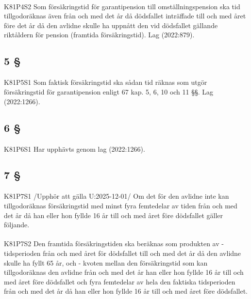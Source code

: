 \documentclass[a4paper,notitlepage,openany,10pt]{book}
\begin{document}
\paragraph*{}
{\tiny K81P4S2}
Som försäkringstid för garantipension till omställningspension ska tid tillgodoräknas även från och med det år då dödsfallet inträffade till och med året före det år då den avlidne skulle ha uppnått den vid dödsfallet gällande riktåldern för pension (framtida försäkringstid).
Lag (2022:879).
\subsection*{5 §}
\paragraph*{}
{\tiny K81P5S1}
Som faktisk försäkringstid ska sådan tid räknas som utgör försäkringstid för garantipension enligt 67 kap. 5, 6, 10 och 11 §§.
Lag (2022:1266).
\subsection*{6 §}
\paragraph*{}
{\tiny K81P6S1}
Har upphävts genom
lag (2022:1266).
\subsection*{7 §}
\paragraph*{}
{\tiny K81P7S1}
/Upphör att gälla U:2025-12-01/
Om det för den avlidne inte kan tillgodoräknas försäkringstid med minst fyra femtedelar av tiden från och med det år då han eller hon fyllde 16 år till och med året före dödsfallet gäller följande.
\paragraph*{}
{\tiny K81P7S2}
Den framtida försäkringstiden ska beräknas som produkten av
\newline - tidsperioden från och med året för dödsfallet till och med det år då den avlidne skulle ha fyllt 65 år, och
\newline - kvoten mellan den försäkringstid som kan tillgodoräknas den avlidne från och med det år han eller hon fyllde 16 år till och med året före dödsfallet och fyra femtedelar av hela den faktiska tidsperioden från och med det år då han eller hon fyllde 16 år till och med året före dödsfallet.
\end{document}
